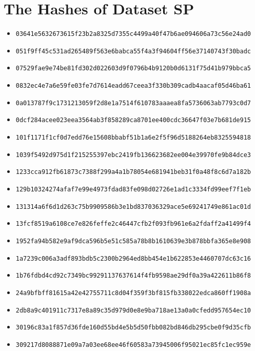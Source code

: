 \section{The Hashes of Dataset SP}\label{appendix:hashes dataset sp}
{\footnotesize
\begin{itemize}
    \item \texttt{03641e5632673615f23b2a8325d7355c4499a40f47b6ae094606a73c56e24ad0}
    \item \texttt{051f9ff45c531ad265489f563e6babca55f4a3f94604ff56e37140743f30badc}
    \item \texttt{07529fae9e74be81fd302d022603d9f0796b4b9120b0d6131f75d41b979bbca5}
    \item \texttt{0832ec4e7a6e59fe03fe7d7614eadd67ceea3f330b309cadb4aacaf05d46ba61}
    \item \texttt{0a013787f9c1731213059f2d8e1a7514f610783aaaea8fa5736063ab7793c0d7}
    \item \texttt{0dcf284acee023eea3564ab3f858289ca8701ee400cdc36647f03e7b681de915}
    \item \texttt{101f1171f1cf0d7edd76e15608bbabf51b1a6e2f5f96d5188264eb8325594818}
    \item \texttt{1039f5492d975d1f215255397ebc2419fb136623682ee004e39970fe9b84dce3}
    \item \texttt{1233cca912fb61873c7388f299a4a1b78054e681941beb31f0a48f8c6d7a182b}
    \item \texttt{129b10324274afaf7e99e4973fdad83fe098d02726e1ad1c3334fd99eef7f1eb}
    \item \texttt{131314a6f6d1d263c75b9909586b3e1bd837036329ace5e69241749e861ac01d}
    \item \texttt{13fcf8519a6108ce7e826feffe2c46447cfb2f093fb961e6a2fdaff2a41499f4}
    \item \texttt{1952fa94b582e9af9dca596b5e51c585a78b8b1610639e3b878bbfa365e8e908}
    \item \texttt{1a7239c006a3adf893bdb5c2300b2964ed8bb454e1b622853e4460707dc63c16}
    \item \texttt{1b76fdbd4cd92c7349bc99291137637614f4fb9598ae29df0a39a422611b86f8}
    \item \texttt{24a9bfbff81615a42e42755711c8d04f359f3bf815fb338022edca860ff1908a}
    \item \texttt{2db8a9c401911c7317e8a89c35d979d0e8e9ba718ae13a0a0cfedd957654ec10}
    \item \texttt{30196c83a1f857d36fde160d55bd4e5b5d50fbb082bd846db295cbe0f9d35cfb}
    \item \texttt{309217d8088871e09a7a03ee68ee46f60583a73945006f95021ec85fc1ec959e}

\end{itemize}}

